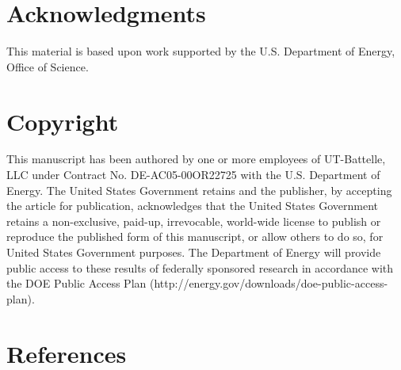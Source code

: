 \documentclass[final,3p,times,twocolumn,authoryear]{elsarticle}
\begin{document}
\section*{Acknowledgments}
This material is based upon work supported by the U.S. Department of Energy, Office of Science. 

\section*{Copyright}
This manuscript has been authored by one or more employees of UT-Battelle, LLC under Contract No. DE-AC05-00OR22725 with the U.S. Department of Energy. The United States Government retains and the publisher, by accepting the article for publication, acknowledges that the United States Government retains a non-exclusive, paid-up, irrevocable, world-wide license to publish or reproduce the published form of this manuscript, or allow others to do so, for United States Government purposes. The Department of Energy will provide public access to these results of federally sponsored research in accordance with the DOE Public Access Plan (http://energy.gov/downloads/doe-public-access-plan).
\section*{References}



 



\begin{thebibliography}{00}


\bibitem[ ()]{}

\end{thebibliography}
\end{document}
